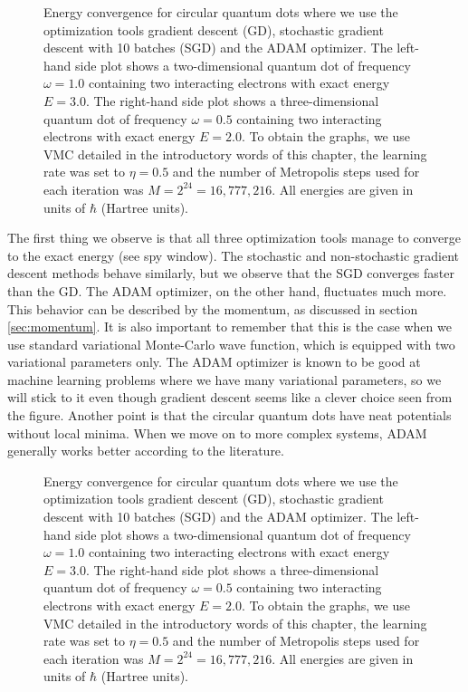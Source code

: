 \begin{figure}[h]
	\centering 
	\subfloat{{}}
	\caption{Energy convergence for circular quantum dots where we use the optimization tools gradient descent (GD), stochastic gradient descent with 10 batches (SGD) and the ADAM optimizer. The left-hand side plot shows a two-dimensional quantum dot of frequency $\omega=1.0$ containing two interacting electrons with exact energy $E=3.0$. The right-hand side plot shows a three-dimensional quantum dot of frequency $\omega=0.5$ containing two interacting electrons with exact energy $E=2.0$. To obtain the graphs, we use VMC detailed in the introductory words of this chapter, the learning rate was set to $\eta=0.5$ and the number of Metropolis steps used for each iteration was $M=2^{24}=16,777,216$. All energies are given in units of $\hbar$ (Hartree units).}
	\label{fig:convergenceoptimization}
\end{figure} 

The first thing we observe is that all three optimization tools manage to converge to the exact energy (see spy window). The stochastic and non-stochastic gradient descent methods behave similarly, but we observe that the SGD converges faster than the GD. The ADAM optimizer, on the other hand, fluctuates much more. This behavior can be described by the momentum, as discussed in section \ref{sec:momentum}. It is also important to remember that this is the case when we use standard variational Monte-Carlo wave function, which is equipped with two variational parameters only. The ADAM optimizer is known to be good at machine learning problems where we have many variational parameters, so we will stick to it even though gradient descent seems like a clever choice seen from the figure. Another point is that the circular quantum dots have neat potentials without local minima. When we move on to more complex systems, ADAM generally works better according to the literature.

\begin{figure}[h]
	\centering 
	\subfloat{{}}
	\caption{Energy convergence for circular quantum dots where we use the optimization tools gradient descent (GD), stochastic gradient descent with 10 batches (SGD) and the ADAM optimizer. The left-hand side plot shows a two-dimensional quantum dot of frequency $\omega=1.0$ containing two interacting electrons with exact energy $E=3.0$. The right-hand side plot shows a three-dimensional quantum dot of frequency $\omega=0.5$ containing two interacting electrons with exact energy $E=2.0$. To obtain the graphs, we use VMC detailed in the introductory words of this chapter, the learning rate was set to $\eta=0.5$ and the number of Metropolis steps used for each iteration was $M=2^{24}=16,777,216$. All energies are given in units of $\hbar$ (Hartree units).}
	\label{fig:convergence42}
\end{figure} 

